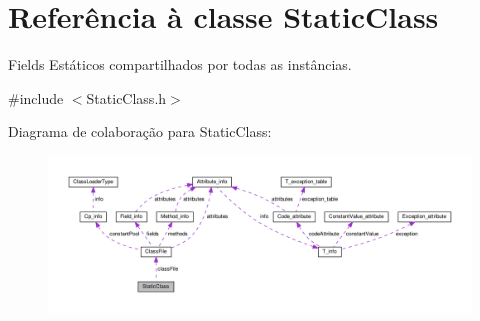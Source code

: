 \hypertarget{classStaticClass}{}\section{Referência à classe Static\+Class}
\label{classStaticClass}


Fields Estáticos compartilhados por todas as instâncias.  




{\ttfamily \#include $<$Static\+Class.\+h$>$}



Diagrama de colaboração para Static\+Class\+:
\nopagebreak
\begin{figure}[H]
\begin{center}
\leavevmode
\includegraphics[width=350pt]{classStaticClass__coll__graph}
\end{center}
\end{figure}
